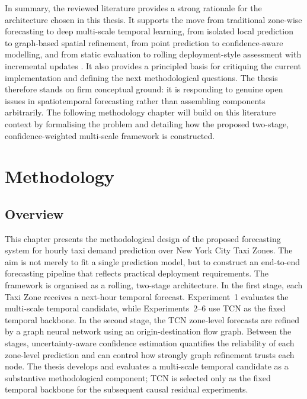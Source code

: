 \documentclass[12pt,a4paper]{report}
\begin{document}
In summary, the reviewed literature provides a strong rationale for the architecture chosen in this thesis. It supports the move from traditional zone-wise forecasting to deep multi-scale temporal learning, from isolated local prediction to graph-based spatial refinement, from point prediction to confidence-aware modelling, and from static evaluation to rolling deployment-style assessment with incremental updates \cite{lim2021survey,jiang2022survey,hewamalage2022pitfalls}. It also provides a principled basis for critiquing the current implementation and defining the next methodological questions. The thesis therefore stands on firm conceptual ground: it is responding to genuine open issues in spatiotemporal forecasting rather than assembling components arbitrarily. The following methodology chapter will build on this literature context by formalising the problem and detailing how the proposed two-stage, confidence-weighted multi-scale framework is constructed.
	
\chapter{Methodology}

\section{Overview}

This chapter presents the methodological design of the proposed forecasting system for hourly taxi demand prediction over New York City Taxi Zones. The aim is not merely to fit a single prediction model, but to construct an end-to-end forecasting pipeline that reflects practical deployment requirements. The framework is organised as a rolling, two-stage architecture. In the first stage, each Taxi Zone receives a next-hour temporal forecast. Experiment~1 evaluates the multi-scale temporal candidate, while Experiments~2--6 use TCN as the fixed temporal backbone. In the second stage, the TCN zone-level forecasts are refined by a graph neural network using an origin-destination flow graph. Between the stages, uncertainty-aware confidence estimation quantifies the reliability of each zone-level prediction and can control how strongly graph refinement trusts each node. The thesis develops and evaluates a multi-scale temporal candidate as a substantive methodological component; TCN is selected only as the fixed temporal backbone for the subsequent causal residual experiments.
\end{document}
